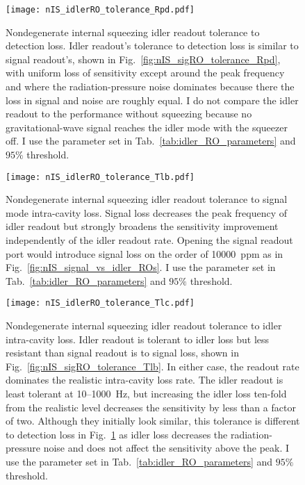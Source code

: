\begin{figure}
    \centering
    \texttt{[image: nIS\_idlerRO\_tolerance\_Rpd.pdf]} 
    \caption{Nondegenerate internal squeezing idler readout tolerance to detection loss. Idler readout's tolerance to detection loss is similar to signal readout's, shown in Fig.~\ref{fig:nIS_sigRO_tolerance_Rpd}, with uniform loss of sensitivity except around the peak frequency and where the radiation-pressure noise dominates because there the loss in signal and noise are roughly equal. I do not compare the idler readout to the performance without squeezing because no gravitational-wave signal reaches the idler mode with the squeezer off. I use the parameter set in Tab.~\ref{tab:idler_RO_parameters} and $95\%$ threshold.}
    \label{fig:nIS_idlerRO_tolerance_Rpd}
\end{figure}
\begin{figure}
	\centering
	\texttt{[image: nIS\_idlerRO\_tolerance\_Tlb.pdf]}
	\caption{ Nondegenerate internal squeezing idler readout tolerance to signal mode intra-cavity loss. Signal loss decreases the peak frequency of idler readout but strongly broadens the sensitivity improvement independently of the idler readout rate. Opening the signal readout port would introduce signal loss on the order of 10000~ppm as in Fig.~\ref{fig:nIS_signal_vs_idler_ROs}. I use the parameter set in Tab.~\ref{tab:idler_RO_parameters} and $95\%$ threshold.}
	\label{fig:nIS_idlerRO_tolerance_Tlb}
\end{figure}
\begin{figure}[t]
	\centering
	\texttt{[image: nIS\_idlerRO\_tolerance\_Tlc.pdf]}
	\caption{ Nondegenerate internal squeezing idler readout tolerance to idler intra-cavity loss. Idler readout is tolerant to idler loss but less resistant than signal readout is to signal loss, shown in Fig.~\ref{fig:nIS_sigRO_tolerance_Tlb}. In either case, the readout rate dominates the realistic intra-cavity loss rate. The idler readout is least tolerant at 10--1000~Hz, but increasing the idler loss ten-fold from the realistic level decreases the sensitivity by less than a factor of two. Although they initially look similar, this tolerance is different to detection loss in Fig.~\ref{fig:nIS_idlerRO_tolerance_Rpd} as idler loss decreases the radiation-pressure noise and does not affect the sensitivity above the peak. I use the parameter set in Tab.~\ref{tab:idler_RO_parameters} and $95\%$ threshold.}
	\label{fig:nIS_idlerRO_tolerance_Tlc}
\end{figure}
